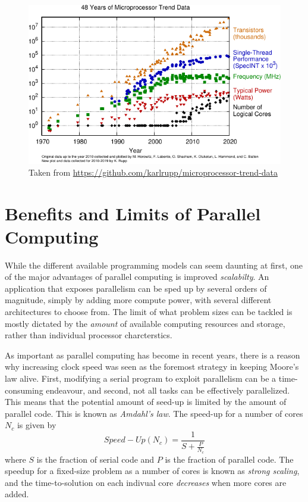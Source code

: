 \begin{figure}
\centering
\includegraphics[scale=1.2]{Pics/moore}
\caption{Taken from \protect\url{https://github.com/karlrupp/microprocessor-trend-data}}
\end{figure}

\section{Benefits and Limits of Parallel Computing}

While the different available programming models can seem daunting at first, one of the major advantages of parallel computing is improved \emph{scalabilty}. An application that exposes parallelism can be sped up by several orders of magnitude, simply by adding more compute power, with several different architectures to choose from. The limit of what problem sizes can be tackled is mostly dictated by the \emph{amount} of available computing resources and storage, rather than individual processor charcterstics.

As important as parallel computing has become in recent years, there is a reason why increasing clock speed was seen as the foremost strategy in keeping Moore's law alive. First, modifying a serial program to exploit parallelism can be a time-consuming endeavour, and second, not all tasks can be effectively parallelized. This means that the potential amount of seed-up is limited by the amount of parallel code. This is known as \emph{Amdahl's law}. The speed-up for a number of cores $N_c$ is given by
\begin{equation}
Speed-Up(N_c) = \frac{1}{S + \frac{P}{N_c}}
\end{equation}
\noindent where $S$ is the fraction of serial code and $P$ is the fraction of parallel code. The speedup for a fixed-size problem as a number of cores is known as \emph{strong scaling}, and the time-to-solution on each indivual core \emph{decreases} when more cores are added.

